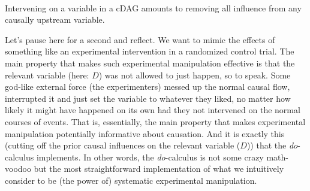 \documentclass[nobib]{tufte-handout}
\newcommand{\docalc}{\emph{do}-calculus\xspace}
\newcommand{\mathdo}{\mathit{do}}
\begin{document}
\begin{marginfigure}[1cm]
  \centering
  \\
  \vspace{-0.5cm}
  \vspace{-1cm}
  \caption{Intervening on a variable in a cDAG amounts to removing all influence from any causally upstream variable.}
  \label{fig:cDAGs-pruned}
\end{marginfigure}

Let's pause here for a second and reflect.
We want to mimic the effects of something like an experimental intervention in a randomized control trial.
The main property that makes such experimental manipulation effective is that the relevant variable (here: $D$) was not allowed to just happen, so to speak.
Some god-like external force (the experimenters) messed up the normal causal flow, interrupted it and just set the variable to whatever they liked, no matter how likely it might have happened on its own had they not intervened on the normal courses of events.
That is, essentially, the main property that makes experimental manipulation potentially informative about causation.
And it is exactly this (cutting off the prior causal influences on the relevant variable ($D$)) that the \docalc implements.
In other words, the \docalc is not some crazy math-voodoo but the most straightforward implementation of what we intuitively consider to be (the power of) systematic experimental manipulation.
\end{document}
